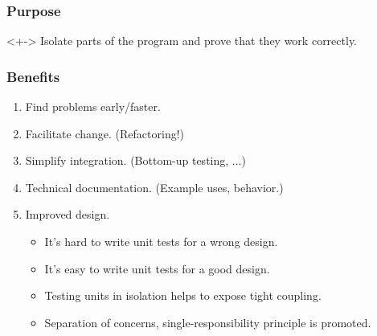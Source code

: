 \begin{frame}
	\frametitle{Purpose}
	\begin{block}{}<+->
		\alert{Isolate} parts of the program and prove that they \alert{work correctly}.
	\end{block}
\end{frame}


\begin{frame}
	\frametitle{Benefits}
	\begin{enumerate}[<+-| highlight@+>]
		\item Find problems early/faster.
		\item Facilitate change. (Refactoring!)
		\item Simplify integration. (Bottom-up testing, ...)
		\item Technical documentation. (Example uses, behavior.)
		\item Improved design.
		\begin{itemize}[<+-| highlight@+>]
			\item It's hard to write unit tests for a wrong design.
			\item It's easy to write unit tests for a good design.
		\end{itemize}
		\begin{itemize}[<+-| highlight@+>]
			\item Testing units in isolation helps to expose tight coupling.
			\item Separation of concerns, single-responsibility principle is promoted.
		\end{itemize}
	\end{enumerate}
\end{frame}

